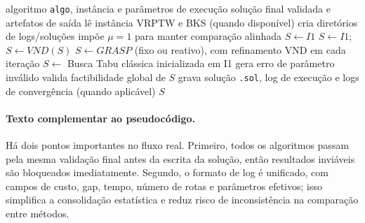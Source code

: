 \begin{algorithm}[htbp]
\caption{Fluxo global do solver}
\label{alg:fluxo_global_solver}
\begin{algorithmic}[1]
\Require algoritmo \texttt{algo}, instância e parâmetros de execução
\Ensure solução final validada e artefatos de saída
\State lê instância VRPTW e BKS (quando disponível)
\State cria diretórios de logs/soluções
\State impõe $\mu=1$ para manter comparação alinhada
  \State $S \leftarrow I1$
\Else
    \State $S \leftarrow I1$; $S \leftarrow VND(S)$
  \Else
      \State $S \leftarrow GRASP$ (fixo ou reativo), com refinamento VND em cada iteração
    \Else
        \State $S \leftarrow$ Busca Tabu clássica inicializada em I1
      \Else
        \State gera erro de parâmetro inválido
      \EndIf
    \EndIf
  \EndIf
\EndIf
\State valida factibilidade global de $S$
\State grava solução \texttt{.sol}, log de execução e logs de convergência (quando aplicável)
\State \Return $S$
\end{algorithmic}
\end{algorithm}

\paragraph{Texto complementar ao pseudocódigo.}
Há dois pontos importantes no fluxo real.
Primeiro, todos os algoritmos passam pela mesma validação final antes da escrita da solução, então resultados inviáveis são bloqueados imediatamente.
Segundo, o formato de log é unificado, com campos de custo, gap, tempo, número de rotas e parâmetros efetivos; isso simplifica a consolidação estatística e reduz risco de inconsistência na comparação entre métodos.
